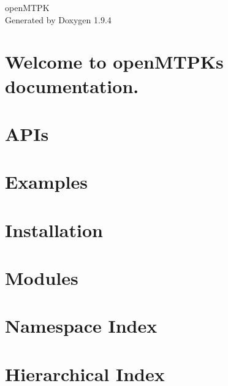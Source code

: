 \documentclass[twoside]{book}
\newcommand{\+}{\discretionary{\mbox{\scriptsize$\hookleftarrow$}}{}{}}
\newcommand{\clearemptydoublepage}{%
    \newpage{\pagestyle{empty}\cleardoublepage}%
  }
\begin{document}
  \raggedbottom
    \hypersetup{pageanchor=false,
                bookmarksnumbered=true,
                pdfencoding=unicode
               }
  \begin{titlepage}
  \vspace*{7cm}
  \begin{center}%
  {\Large open\+MTPK}\\
  \vspace*{1cm}
  {\large Generated by Doxygen 1.9.4}\\
  \end{center}
  \end{titlepage}
  \clearemptydoublepage
  \tableofcontents
  \clearemptydoublepage
  \hypersetup{pageanchor=true}
\chapter{Welcome to open\+MTPK\textquotesingle{}s documentation.}
\label{index}\hypertarget{index}{}
\chapter{APIs}
\label{md_docs_source_APIs}

\chapter{Examples}
\label{md_docs_source_Examples}

\chapter{Installation}
\label{md_docs_source_Installation}

\chapter{Modules}
\label{md_docs_source_Modules}

\chapter{Namespace Index}

\chapter{Hierarchical Index}

\end{document}
